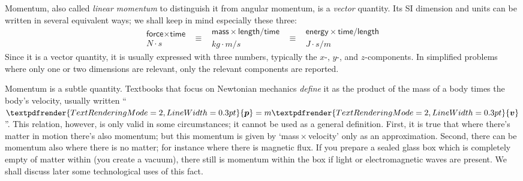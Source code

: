 \documentclass[a4paper,12pt,%
onecolumn,oneside,titlepage,%
british%
]{memoir}
\renewcommand*{\bm}[1]{\textpdfrender{TextRenderingMode=2,LineWidth=0.3pt}{\boldsymbol{#1}}}
\newcommand{\mynotew}[1]{{\footnotesize\color{midgrey}\faIcon{tools}\ #1}}
\renewcommand*{\|}[1][]{\nonscript\:#1\vert\nonscript\:\mathopen{}}
\begin{document}
Momentum, also called \emph{linear momentum} to distinguish it from angular momentum, is a \emph{vector} quantity. Its SI dimension and units can be written in several equivalent ways; we shall keep in mind especially these three:
\begin{equation*}
  \begin{gathered}
    \textsf{force}\times\textsf{time}
    \\\unit{N\cdot s}
  \end{gathered}
\enspace  \equiv\enspace
  \begin{gathered}
  \textsf{mass}\times\textsf{length}/\textsf{time}
    \\\unit{kg\cdot m/s}
  \end{gathered}
\enspace  \equiv\enspace
  \begin{gathered}
  \textsf{energy}\times\textsf{time}/\textsf{length}
    \\\unit{J\cdot s/m}
  \end{gathered}
\end{equation*}
Since it is a vector quantity, it is usually expressed with three numbers, typically the $x$-, $y$-, and $z$-components. In simplified problems where only one or two dimensions are relevant, only the relevant components are reported.

Momentum is a subtle quantity. Textbooks that focus on Newtonian mechanics \emph{define} it as the product of the mass of a body times the body's velocity, usually written \enquote{$\bm{p}=m\bm{v}$}. This relation, however, is only valid in some circumstances; it cannot be used as a general definition. First, it is true that where there's matter in motion there's also momentum; but this momentum is given by \enquote*{mass${}\times{}$velocity} only as an approximation. Second, there can be momentum also where there is no matter; for instance where there is magnetic flux. If you prepare a sealed glass box which is completely empty of matter within (you create a vacuum), there still is momentum within the box if light or electromagnetic waves are present. We shall discuss later some technological uses of this fact.
\end{document}
